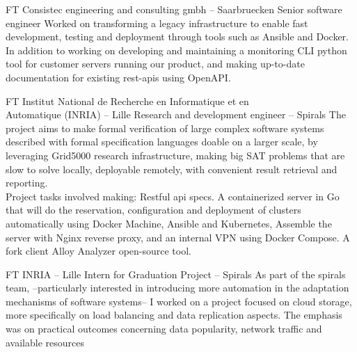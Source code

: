 \documentclass[10pt]{article} %
\begin{document}
\begin{paracol}{2}


{FT} %
{Consistec engineering and consulting gmbh -- Saarbruecken} %
{Senior software engineer} %
{Worked on transforming a legacy infrastructure to enable fast development, testing and deployment through tools such as Ansible and Docker. In addition to working on developing and maintaining a monitoring CLI python tool for customer servers running our product, and making up-to-date documentation for existing rest-apis using OpenAPI. } %


{FT} %
{Institut National de Recherche en Informatique et en\\Automatique (INRIA) -- Lille} %
{Research and development engineer -- Spirals} %
{The project aims to make formal verification of large complex software systems described with formal specification languages doable on a larger scale, by leveraging Grid5000 research infrastructure, making big SAT problems that are slow to solve locally, deployable remotely, with convenient result retrieval and reporting. \\Project tasks involved making:\hspace{1mm} Restful api specs.\hspace{1mm} A containerized server in Go that will do the reservation, configuration and deployment of clusters automatically using Docker Machine, Ansible and Kubernetes, \hspace{1mm} Assemble the server with Nginx reverse proxy, and an internal VPN using Docker Compose.\hspace{1mm} A fork client Alloy Analyzer open-source tool.\hspace{1mm}} %


\vspace{-\baselineskip}\medskip %

{FT} %
{INRIA -- Lille} %
{Intern for Graduation Project -- Spirals} %
{As part of the spirals team, --particularly interested in introducing more automation in the adaptation mechanisms of software systems-- I worked on a project focused on cloud storage, more specifically on load balancing and data replication aspects. The emphasis was on practical outcomes concerning data popularity, network traffic and available resources} %


\end{paracol}
\end{document}
